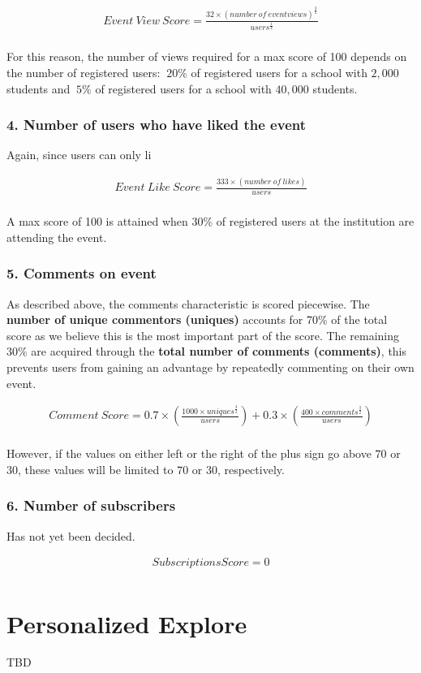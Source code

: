 \documentclass[12pt]{amsart}
\begin{document}
	\begin{align*}
		Event \ View \ Score = \frac{32\times(number \ of \ event views)^{\frac{3}{2}}}{users^{\frac{1}{4}}}\\
	\end{align*}
	
\noindent For this reason, the number of views required for a max score of 100 depends on the number of registered users: $~20\%$ of registered users for a school with $2,000$ students and $~5\%$ of registered users for a school with $40,000$ students.

\medskip

\subsubsection*{4. Number of users who have liked the event}

Again, since users can only li

	\begin{align*}
		Event \ Like \ Score = \frac{333\times(number \ of \ likes)}{users}\\
	\end{align*}
	
\noindent A max score of 100 is attained when 30\% of registered users at the institution are attending the event.

\medskip

\subsubsection*{5. Comments on event}

As described above, the comments characteristic is scored piecewise. The \textbf{number of unique commentors (uniques)} accounts for 70\% of the total score as we believe this is the most important part of the score. The remaining 30\% are acquired through the \textbf{total number of comments (comments)}, this prevents users from gaining an advantage by repeatedly commenting on their own event.

	\begin{align*}
		Comment \ Score = 0.7 \times \left(\frac{1000 \times uniques^{\frac{3}{2}}}{users}\right) + 0.3 \times \left(\frac{400 \times comments^{\frac{3}{2}}}{users}\right)\\
	\end{align*}
	
\noindent However, if the values on either left or the right of the plus sign go above $70$ or $30$, these values will be limited to $70$ or $30$, respectively.

\medskip

\subsubsection*{6. Number of subscribers}

Has not yet been decided.

	\begin{align*}
		Subscriptions Score = 0\\
	\end{align*}
		
\section*{Personalized Explore}

TBD
	
\end{document}
